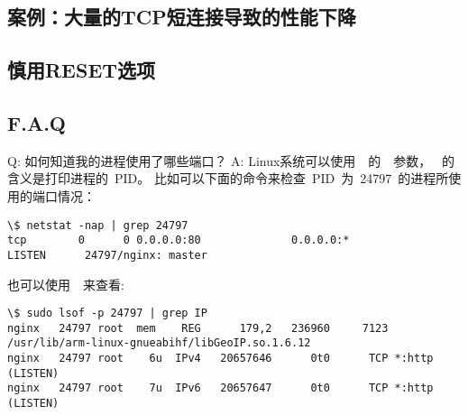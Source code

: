 \subsection{案例：大量的TCP短连接导致的性能下降}

\subsection{慎用RESET选项}

\subsection{F.A.Q}

Q: 如何知道我的进程使用了哪些端口？
A: Linux系统可以使用~~的~~参数，
~的含义是打印进程的~PID。
比如可以下面的命令来检查~PID~为~24797~的进程所使用的端口情况：

\begin{lstlisting}
\$ netstat -nap | grep 24797
tcp        0      0 0.0.0.0:80              0.0.0.0:*               LISTEN      24797/nginx: master
\end{lstlisting}

也可以使用~~来查看:

\begin{lstlisting}
\$ sudo lsof -p 24797 | grep IP
nginx   24797 root  mem    REG      179,2   236960     7123 /usr/lib/arm-linux-gnueabihf/libGeoIP.so.1.6.12
nginx   24797 root    6u  IPv4   20657646      0t0      TCP *:http (LISTEN)
nginx   24797 root    7u  IPv6   20657647      0t0      TCP *:http (LISTEN)
\end{lstlisting}
